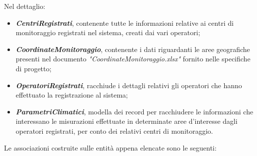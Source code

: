 Nel dettaglio:
\begin{itemize}
	\item \textbf{\textit{CentriRegistrati}}, contenente tutte le informazioni relative ai centri di monitoraggio registrati nel sistema, creati dai vari operatori;
	\item \textbf{\textit{CoordinateMonitoraggio}}, contenente i dati riguardanti le aree geografiche presenti nel documento \textit{"CoordinateMonitoraggio.xlsx"} fornito nelle specifiche di progetto;
	\item \textbf{\textit{OperatoriRegistrati}}, racchiude i dettagli relativi gli operatori che hanno effettuato la registrazione al sistema;
	\item \textbf{\textit{ParametriClimatici}}, modella dei record per racchiudere le informazioni che interessano le misurazioni effettuate in determinate aree d'interesse dagli operatori registrati, per conto dei relativi centri di monitoraggio.
\end{itemize}
\pagebreak
Le associazioni costruite sulle entità appena elencate sono le seguenti:
